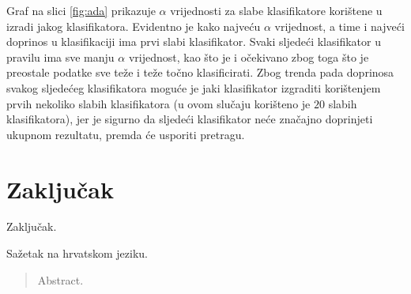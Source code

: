 \documentclass[times, utf8, zavrsni, numeric]{fer}
\begin{document}
Graf na slici \ref{fig:ada} prikazuje $\alpha$ vrijednosti za slabe klasifikatore korištene u izradi jakog klasifikatora. 
Evidentno je kako najveću $\alpha$ vrijednost, a time i najveći doprinos u klasifikaciji ima prvi slabi klasifikator. 
Svaki sljedeći klasifikator u pravilu ima sve manju $\alpha$ vrijednost, kao što je i očekivano zbog toga što je preostale podatke sve teže i teže točno klasificirati. 
Zbog trenda pada doprinosa svakog sljedećeg klasifikatora moguće je jaki klasifikator izgraditi korištenjem prvih nekoliko slabih klasifikatora (u ovom slučaju korišteno je $20$ slabih klasifikatora), jer je sigurno da sljedeći klasifikator neće značajno doprinjeti ukupnom rezultatu, premda će usporiti pretragu.


\chapter{Zaključak}
Zaključak.





\begin{sazetak}
Sažetak na hrvatskom jeziku.

\end{sazetak}

\begin{abstract}
Abstract.

\end{abstract}
\end{document}
